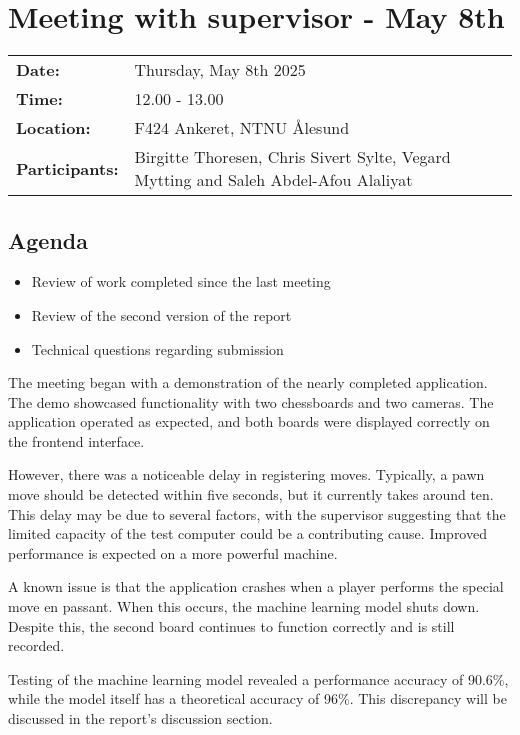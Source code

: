 \section{Meeting with supervisor - May 8th}
\begin{tabular}{ll}
    \textbf{Date:} & Thursday, May 8th 2025 \\
    \textbf{Time:} & 12.00 - 13.00\\
    \textbf{Location:} & F424 Ankeret, NTNU Ålesund \\
    \textbf{Participants:} & Birgitte Thoresen, Chris Sivert Sylte, Vegard Mytting and Saleh Abdel-Afou Alaliyat\\
\end{tabular}

\vspace{0.5cm}

\subsection{Agenda}

\begin{itemize} 
    \item Review of work completed since the last meeting
    \item Review of the second version of the report
    \item Technical questions regarding submission
\end{itemize}

The meeting began with a demonstration of the nearly completed application. The demo showcased functionality with two chessboards and two cameras. The application operated as expected, and both boards were displayed correctly on the frontend interface.

However, there was a noticeable delay in registering moves. Typically, a pawn move should be detected within five seconds, but it currently takes around ten. This delay may be due to several factors, with the supervisor suggesting that the limited capacity of the test computer could be a contributing cause. Improved performance is expected on a more powerful machine.

A known issue is that the application crashes when a player performs the special move en passant. When this occurs, the machine learning model shuts down. Despite this, the second board continues to function correctly and is still recorded.

Testing of the machine learning model revealed a performance accuracy of 90.6\%, while the model itself has a theoretical accuracy of 96\%. This discrepancy will be discussed in the report’s discussion section. 

